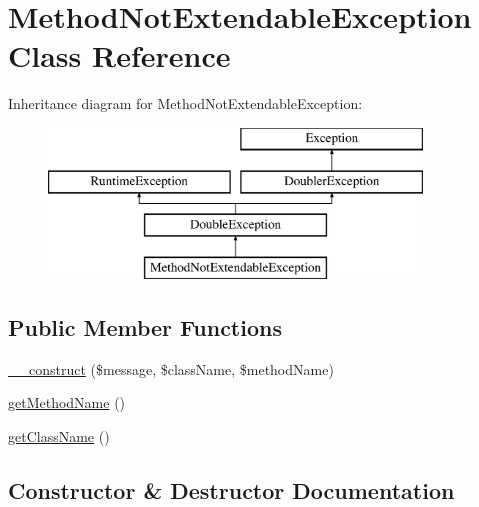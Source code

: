 \hypertarget{class_prophecy_1_1_exception_1_1_doubler_1_1_method_not_extendable_exception}{}\section{Method\+Not\+Extendable\+Exception Class Reference}
\label{class_prophecy_1_1_exception_1_1_doubler_1_1_method_not_extendable_exception}
Inheritance diagram for Method\+Not\+Extendable\+Exception\+:\begin{figure}[H]
\begin{center}
\leavevmode
\includegraphics[height=4.000000cm]{class_prophecy_1_1_exception_1_1_doubler_1_1_method_not_extendable_exception}
\end{center}
\end{figure}
\subsection*{Public Member Functions}
\begin{DoxyCompactItemize}
\item 
\mbox{\hyperlink{class_prophecy_1_1_exception_1_1_doubler_1_1_method_not_extendable_exception_adb9920cfcab7bff6ff305dff6db9f3ef}{\+\_\+\+\_\+construct}} (\$message, \$class\+Name, \$method\+Name)
\item 
\mbox{\hyperlink{class_prophecy_1_1_exception_1_1_doubler_1_1_method_not_extendable_exception_a0fa2079426d0262e759c4105fa4e9163}{get\+Method\+Name}} ()
\item 
\mbox{\hyperlink{class_prophecy_1_1_exception_1_1_doubler_1_1_method_not_extendable_exception_ab8f8ee56588ebf5091c288e44ebdfaf4}{get\+Class\+Name}} ()
\end{DoxyCompactItemize}


\subsection{Constructor \& Destructor Documentation}
\mbox{\label{class_prophecy_1_1_exception_1_1_doubler_1_1_method_not_extendable_exception_adb9920cfcab7bff6ff305dff6db9f3ef}} 
